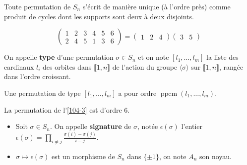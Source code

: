   \begin{theorem}
    Toute permutation de $S_n$ s'écrit de manière unique (à l'ordre près) comme produit de cycles dont les supports sont deux à deux disjoints.
  \end{theorem}

  \begin{example}
    \label{104-3}
    \[
      \begin{pmatrix}
        1 & 2 & 3 & 4 & 5 & 6 \\
        2 & 4 & 5 & 1 & 3 & 6
      \end{pmatrix}
      =
      \begin{pmatrix} 1 & 2 & 4 \end{pmatrix}\begin{pmatrix} 3 & 5 \end{pmatrix}
    \]
  \end{example}

  \begin{definition}
    On appelle \textbf{type} d'une permutation $\sigma \in S_n$ et on note $[l_1, \dots, l_m]$ la liste des cardinaux $l_i$ des orbites dans $\llbracket 1, n \rrbracket$ de l'action du groupe $\langle \sigma \rangle$ sur $\llbracket 1, n \rrbracket$, rangée dans l'ordre croissant.
  \end{definition}

  \begin{proposition}
    Une permutation de type $[l_1, \dots, l_m]$ a pour ordre $\operatorname{ppcm}(l_1, \dots, l_m)$.
  \end{proposition}

  \begin{example}
    La permutation de l'\cref{104-3} est d'ordre $6$.
  \end{example}

  \begin{definition}
    \begin{itemize}
      \item Soit $\sigma \in S_n$. On appelle \textbf{signature} de $\sigma$, notée $\epsilon(\sigma)$ l'entier $\epsilon(\sigma) = \prod_{i \neq j} \frac{\sigma(i) - \sigma(j)}{i-j}$.
      \item $\sigma \mapsto \epsilon(\sigma)$ est un morphisme de $S_n$ dans $\{ \pm 1 \}$, on note $A_n$ son noyau.
    \end{itemize}
  \end{definition}


